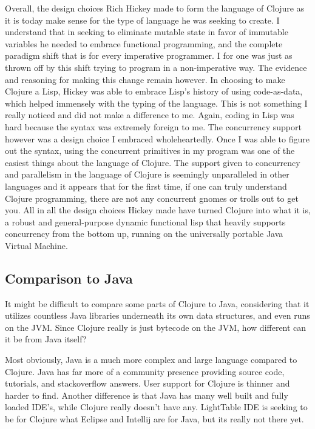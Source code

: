     Overall, the design choices Rich Hickey made to form the language of Clojure as it is today make sense for the type of language he was seeking to create. I understand that in seeking to eliminate mutable state in favor of immutable variables he needed to embrace functional programming, and the complete paradigm shift that is for every imperative programmer. I for one was just as thrown off by this shift trying to program in a non-imperative way. The evidence and reasoning for making this change remain however. In choosing to make Clojure a Lisp, Hickey was able to embrace Lisp's history of using code-as-data, which helped immensely with the typing of the language. This is not something I really noticed and did not make a difference to me. Again, coding in Lisp was hard because the syntax was extremely foreign to me. The concurrency support however was a design choice I embraced wholeheartedly. Once I was able to figure out the syntax, using the concurrent primitives in my program was one of the easiest things about the language of Clojure. The support given to concurrency and parallelism in the language of Clojure is seemingly unparalleled in other languages and it appears that for the first time, if one can truly understand Clojure programming, there are not any concurrent gnomes or trolls out to get you. All in all the design choices Hickey made have turned Clojure into what it is, a robust and general-purpose dynamic functional lisp that heavily supports concurrency from the bottom up, running on the universally portable Java Virtual Machine.

\subsection{Comparison to Java}

    It might be difficult to compare some parts of Clojure to Java, considering that it utilizes countless Java libraries underneath its own data structures, and even runs on the JVM. Since Clojure really is just bytecode on the JVM, how different can it be from Java itself?
    
    Most obviously, Java is a much more complex and large language compared to Clojure. Java has far more of a community presence providing source code, tutorials, and stackoverflow answers. User support for Clojure is thinner and harder to find. Another difference is that Java has many well built and fully loaded IDE's, while Clojure really doesn't have any. LightTable IDE is seeking to be for Clojure what Eclipse and Intellij are for Java, but its really not there yet.
    
